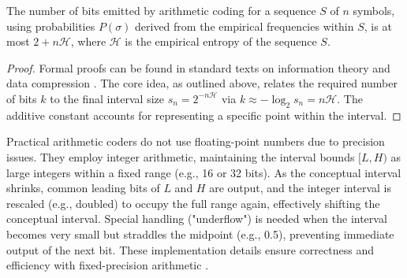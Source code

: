 \begin{theorem} \label{thm:arithmetic_bits}
    The number of bits emitted by arithmetic coding for a sequence $S$ of $n$ symbols, using probabilities $P(\sigma)$ derived from the empirical frequencies within $S$, is at most $2 + n\mathcal{H}$, where $\mathcal{H}$ is the empirical entropy of the sequence $S$.
\end{theorem}
\begin{proof}
    Formal proofs can be found in standard texts on information theory and data compression \cite{ferragina2023pearls, sayood2002lossless, han2002mathematics, ElementsofInformationTheory}. The core idea, as outlined above, relates the required number of bits $k$ to the final interval size $s_n = 2^{-n\mathcal{H}}$ via $k \approx -\log_2 s_n = n\mathcal{H}$. The additive constant accounts for representing a specific point within the interval.
\end{proof}

\begin{remark}
    Practical arithmetic coders do not use floating-point numbers due to precision issues. They employ integer arithmetic, maintaining the interval bounds $[L, H)$ as large integers within a fixed range (e.g., 16 or 32 bits). As the conceptual interval shrinks, common leading bits of $L$ and $H$ are output, and the integer interval is rescaled (e.g., doubled) to occupy the full range again, effectively shifting the conceptual interval. Special handling ("underflow") is needed when the interval becomes very small but straddles the midpoint (e.g., 0.5), preventing immediate output of the next bit. These implementation details ensure correctness and efficiency with fixed-precision arithmetic \cite{moffat1998arithmetic}.
\end{remark}


